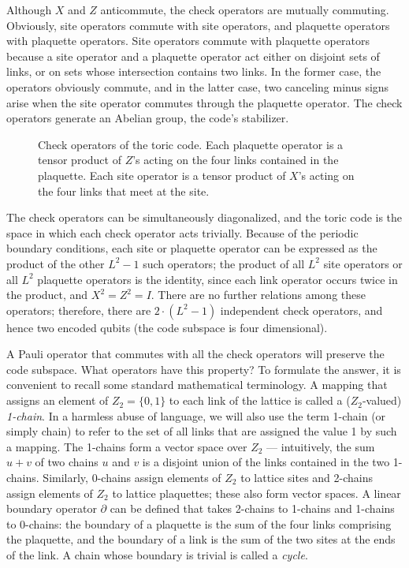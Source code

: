 Although $X$ and $Z$ anticommute, the check operators are mutually commuting. Obviously, site operators commute with site operators, and plaquette operators with plaquette operators. Site operators commute with plaquette operators because a site operator and a plaquette operator act either on disjoint sets of links, or on sets whose intersection contains two links. In the former case, the operators obviously commute, and in the latter case, two canceling minus signs arise when the site operator commutes through the plaquette operator. The check operators generate an Abelian group, the code's stabilizer.

\begin{figure}
\begin{center}
\leavevmode
\epsfxsize=3in
\end{center}
\caption{Check operators of the toric code. Each plaquette operator is a tensor product of $Z$'s acting on the four links contained in the plaquette. Each site operator is a tensor product of $X$'s acting on the four links that meet at the site.}
\label{fig_checks}
\end{figure}

The check operators can be simultaneously diagonalized, and the toric code is the space in which each check operator acts trivially.  Because of the periodic boundary conditions, each site or plaquette operator can be expressed as the product of the other $L^2-1$ such operators; the product of all $L^2$ site operators or all $L^2$ plaquette operators is the identity, since each link operator occurs twice in the product, and $X^2=Z^2=I$. There are no further relations among these operators; therefore, there are $2\cdot (L^2-1)$ independent check operators, and hence two encoded qubits (the code subspace is four dimensional).

A Pauli operator that commutes with all the check operators will preserve the code subspace.  What operators have this property? To formulate the answer, it is convenient to recall some standard mathematical terminology. A mapping that assigns an element of $Z_2=\{0,1\}$ to each link of the lattice is called a ($Z_2$-valued) {\em 1-chain}. In a harmless abuse of language, we will also use the term 1-chain (or simply chain) to refer to the set of all links that are assigned the value 1 by such a mapping. The 1-chains form a vector space over $Z_2$ --- intuitively, the sum $u+v$ of two chains $u$ and $v$ is a disjoint union of the links contained in the two 1-chains. Similarly, 0-chains assign elements of $Z_2$ to lattice sites and 2-chains assign elements of $Z_2$ to lattice plaquettes; these also form vector spaces. A linear boundary operator $\partial$ can be defined that takes 2-chains to 1-chains and 1-chains to 0-chains: the boundary of a plaquette is the sum of the four links comprising the plaquette, and the boundary of a link is the sum of the two sites at the ends of the link. A chain whose boundary is trivial is called a {\em cycle}.

